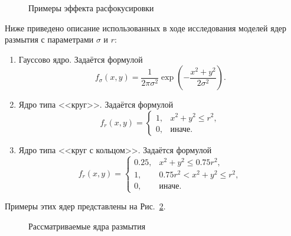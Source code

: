 \begin{figure}[ht]
	\caption{Примеры эффекта расфокусировки}
	\label{fig:warping-defocus}
\end{figure}

Ниже приведено описание использованных в ходе исследования моделей ядер размытия с параметрами $\sigma$ и $r$:
\begin{enumerate}[beginpenalty=10000]
	\item Гауссово ядро.
	Задаётся формулой
	$$f_\sigma\left(x,y\right) = \frac{1}{2\pi\sigma^2}\exp\left(-\frac{x^2+y^2}{2\sigma^2}\right).$$
	
	\item Ядро типа <<круг>>.
	Задаётся формулой $$f_r\left(x,y\right) = \begin{cases}
		1, & x^2 + y^2 \leq r^2, \\
		0, & \text{иначе}.
	\end{cases}$$
	
	\item Ядро типа <<круг с кольцом>>.
	Задаётся формулой $$f_r(x, y) = \begin{cases}
		0.25, & x^2 + y^2 \leq 0.75 r^2,\\
		1, & 0.75 r^2 < x^2 + y^2 \leq r^2,\\
		0, & \text{иначе}.
	\end{cases}$$
\end{enumerate}

Примеры этих ядер представлены на Рис.~\ref{fig:warping-psf-examples}. %

\begin{figure}[ht]
	\caption{Рассматриваемые ядра размытия}
	\label{fig:warping-psf-examples}
\end{figure}

